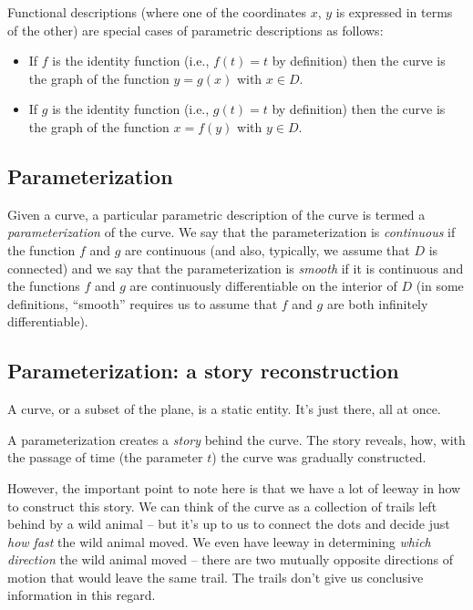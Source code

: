 \documentclass[10pt]{amsart}
\begin{document}
Functional descriptions (where one of the coordinates $x$, $y$ is
expressed in terms of the other) are special cases of parametric
descriptions as follows:

\begin{itemize}
\item If $f$ is the identity function (i.e., $f(t) = t$ by definition)
  then the curve is the graph of the function $y = g(x)$ with $x \in
  D$.
\item If $g$ is the identity function (i.e., $g(t) = t$ by definition)
  then the curve is the graph of the function $x = f(y)$ with $y \in
  D$.
\end{itemize} 

\subsection{Parameterization}

Given a curve, a particular parametric description of the curve is
termed a {\em parameterization} of the curve. We say that the
parameterization is {\em continuous} if the function $f$ and $g$ are
continuous (and also, typically, we assume that $D$ is connected) and
we say that the parameterization is {\em smooth} if it is continuous
and the functions $f$ and $g$ are continuously differentiable on the
interior of $D$ (in some definitions, ``smooth'' requires us to assume
that $f$ and $g$ are both infinitely differentiable).

\subsection{Parameterization: a story reconstruction}

A curve, or a subset of the plane, is a static entity. It's just
there, all at once.

A parameterization creates a {\em story} behind the curve. The story
reveals, how, with the passage of time (the parameter $t$) the curve
was gradually constructed.

However, the important point to note here is that we have a lot of
leeway in how to construct this story. We can think of the curve as a
collection of trails left behind by a wild animal -- but it's up to us
to connect the dots and decide just {\em how fast} the wild animal
moved. We even have leeway in determining {\em which direction} the
wild animal moved -- there are two mutually opposite directions of
motion that would leave the same trail. The trails don't give us
conclusive information in this regard.
\end{document}
